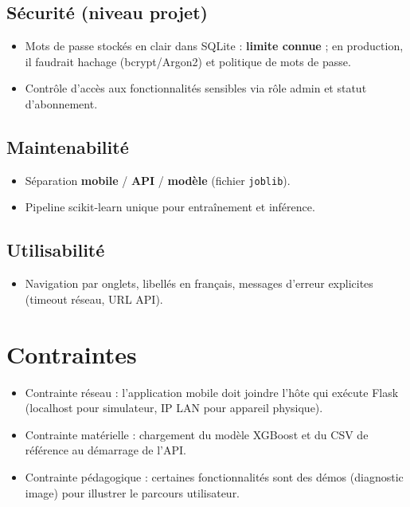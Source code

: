 \documentclass[12pt,a4paper,twoside,openright]{report}
\begin{document}
\subsection{Sécurité (niveau projet)}
\begin{itemize}
  \item Mots de passe stockés en clair dans SQLite : \textbf{limite connue} ; en production, il faudrait hachage (bcrypt/Argon2) et politique de mots de passe.
  \item Contrôle d'accès aux fonctionnalités sensibles via rôle admin et statut d'abonnement.
\end{itemize}

\subsection{Maintenabilité}
\begin{itemize}
  \item Séparation \textbf{mobile} / \textbf{API} / \textbf{modèle} (fichier \texttt{joblib}).
  \item Pipeline scikit-learn unique pour entraînement et inférence.
\end{itemize}

\subsection{Utilisabilité}
\begin{itemize}
  \item Navigation par onglets, libellés en français, messages d'erreur explicites (timeout réseau, URL API).
\end{itemize}

\section{Contraintes}

\begin{itemize}
  \item Contrainte réseau : l'application mobile doit joindre l'hôte qui exécute Flask (localhost pour simulateur, IP LAN pour appareil physique).
  \item Contrainte matérielle : chargement du modèle XGBoost et du CSV de référence au démarrage de l'API.
  \item Contrainte pédagogique : certaines fonctionnalités sont des démos (diagnostic image) pour illustrer le parcours utilisateur.
\end{itemize}
\end{document}
